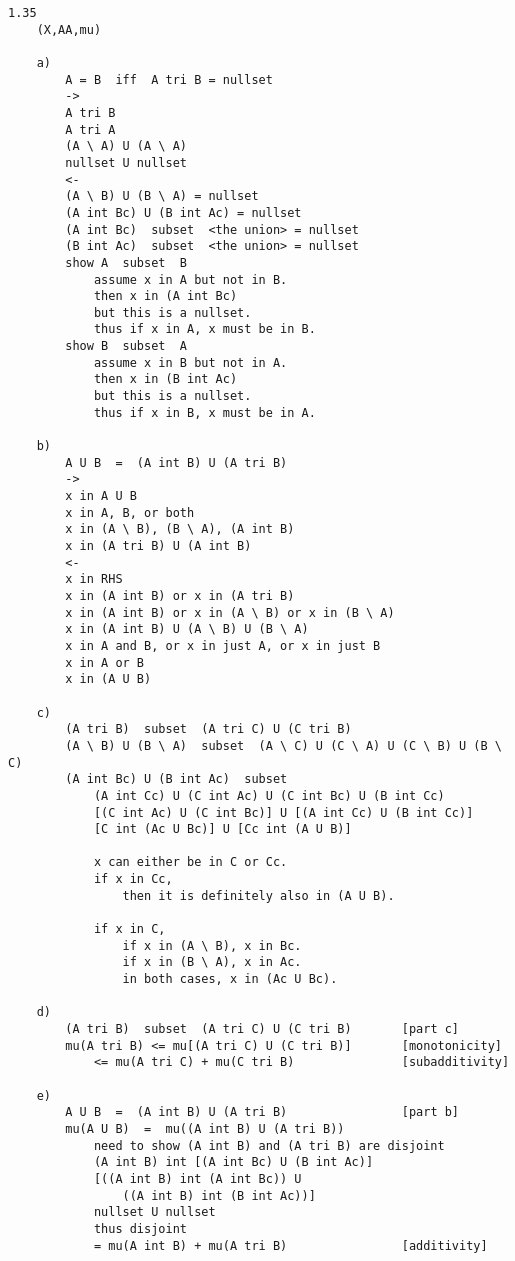 \documentclass{article}
\begin{document}
\begin{flushleft}
\begin{verbatim}
1.35
    (X,AA,mu)

    a)
        A = B  iff  A tri B = nullset 
        ->
        A tri B 
        A tri A 
        (A \ A) U (A \ A) 
        nullset U nullset 
        <- 
        (A \ B) U (B \ A) = nullset 
        (A int Bc) U (B int Ac) = nullset 
        (A int Bc)  subset  <the union> = nullset 
        (B int Ac)  subset  <the union> = nullset
        show A  subset  B 
            assume x in A but not in B. 
            then x in (A int Bc)
            but this is a nullset. 
            thus if x in A, x must be in B.
        show B  subset  A 
            assume x in B but not in A.
            then x in (B int Ac)
            but this is a nullset. 
            thus if x in B, x must be in A.

    b)
        A U B  =  (A int B) U (A tri B)
        -> 
        x in A U B
        x in A, B, or both 
        x in (A \ B), (B \ A), (A int B)
        x in (A tri B) U (A int B)
        <- 
        x in RHS 
        x in (A int B) or x in (A tri B)
        x in (A int B) or x in (A \ B) or x in (B \ A)
        x in (A int B) U (A \ B) U (B \ A)
        x in A and B, or x in just A, or x in just B
        x in A or B 
        x in (A U B)

    c)
        (A tri B)  subset  (A tri C) U (C tri B)
        (A \ B) U (B \ A)  subset  (A \ C) U (C \ A) U (C \ B) U (B \ C)
        (A int Bc) U (B int Ac)  subset 
            (A int Cc) U (C int Ac) U (C int Bc) U (B int Cc)
            [(C int Ac) U (C int Bc)] U [(A int Cc) U (B int Cc)]
            [C int (Ac U Bc)] U [Cc int (A U B)]
            
            x can either be in C or Cc. 
            if x in Cc, 
                then it is definitely also in (A U B).

            if x in C, 
                if x in (A \ B), x in Bc. 
                if x in (B \ A), x in Ac. 
                in both cases, x in (Ac U Bc).

    d)
        (A tri B)  subset  (A tri C) U (C tri B)       [part c]
        mu(A tri B) <= mu[(A tri C) U (C tri B)]       [monotonicity]
            <= mu(A tri C) + mu(C tri B)               [subadditivity]

    e)
        A U B  =  (A int B) U (A tri B)                [part b]
        mu(A U B)  =  mu((A int B) U (A tri B))
            need to show (A int B) and (A tri B) are disjoint 
            (A int B) int [(A int Bc) U (B int Ac)]
            [((A int B) int (A int Bc)) U 
                ((A int B) int (B int Ac))]
            nullset U nullset 
            thus disjoint 
            = mu(A int B) + mu(A tri B)                [additivity]


\end{verbatim}
\end{flushleft}
\end{document}

